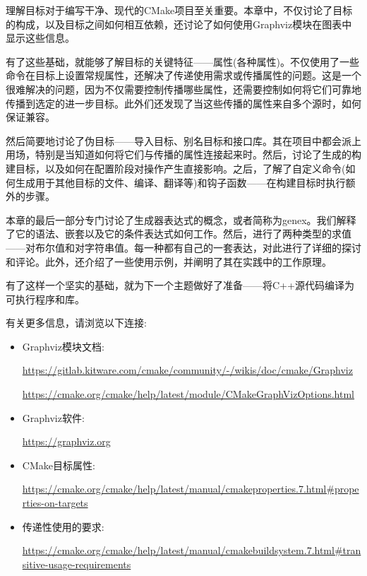 
理解目标对于编写干净、现代的CMake项目至关重要。本章中，不仅讨论了目标的构成，以及目标之间如何相互依赖，还讨论了如何使用Graphviz模块在图表中显示这些信息。

有了这些基础，就能够了解目标的关键特征——属性(各种属性)。不仅使用了一些命令在目标上设置常规属性，还解决了传递使用需求或传播属性的问题。这是一个很难解决的问题，因为不仅需要控制传播哪些属性，还需要控制如何将它们可靠地传播到选定的进一步目标。此外们还发现了当这些传播的属性来自多个源时，如何保证兼容。

然后简要地讨论了伪目标——导入目标、别名目标和接口库。其在项目中都会派上用场，特别是当知道如何将它们与传播的属性连接起来时。然后，讨论了生成的构建目标，以及如何在配置阶段对操作产生直接影响。之后，了解了自定义命令(如何生成用于其他目标的文件、编译、翻译等)和钩子函数——在构建目标时执行额外的步骤。

本章的最后一部分专门讨论了生成器表达式的概念，或者简称为genex。我们解释了它的语法、嵌套以及它的条件表达式如何工作。然后，进行了两种类型的求值——对布尔值和对字符串值。每一种都有自己的一套表达，对此进行了详细的探讨和评论。此外，还介绍了一些使用示例，并阐明了其在实践中的工作原理。

有了这样一个坚实的基础，就为下一个主题做好了准备——将C++源代码编译为可执行程序和库。


有关更多信息，请浏览以下连接:

\begin{itemize}
\item 
Graphviz模块文档:

\url{https://gitlab.kitware.com/cmake/community/-/wikis/doc/cmake/Graphviz}

\url{https://cmake.org/cmake/help/latest/module/CMakeGraphVizOptions.html}
	
\item 
Graphviz软件:

\url{https://graphviz.org}
	
\item 
CMake目标属性:

\url{https://cmake.org/cmake/help/latest/manual/cmakeproperties.7.html\#properties-on-targets}

\item 
传递性使用的要求:
 
\url{https://cmake.org/cmake/help/latest/manual/cmakebuildsystem.7.html\#transitive-usage-requirements}
\end{itemize}










